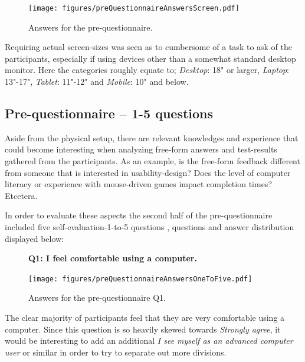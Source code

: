 \documentclass[nofilelist,dvipsnames]{cslthse-msc}
\begin{document}
{				\begin{figure}[h!]
					\centering
					\texttt{[image: figures/preQuestionnaireAnswersScreen.pdf]}
					\caption{Answers for the pre-questionnaire.}
				\end{figure}

        Requiring actual screen-sizes was seen as to cumbersome of a task to
        ask of the participants, especially if using devices other than a
        somewhat standard desktop monitor. Here the categories roughly equate
        to; \textit{Desktop}: 18" or larger, \textit{Laptop}: 13"-17", \textit{Tablet}:
        11"-12" and \textit{Mobile}: 10" and below.

			\subsection{Pre-questionnaire -- 1-5 questions}

        Aside from the physical setup, there are relevant knowledges and
        experience that could become interesting when analyzing free-form
        answers and test-results gathered from the participants. As an example,
        is the free-form feedback different from someone that is interested in
        usability-design? Does the level of computer literacy or experience
        with mouse-driven games impact completion times? Etcetera.

        In order to evaluate these aspects the second half of the
        pre-questionnaire included five self-evaluation-1-to-5 questions
        , questions and answer distribution
        displayed below:

				\begin{figure}[h!]
          \textbf{Q1: I feel comfortable using a computer.}
          \begin{center}
            \texttt{[image: figures/preQuestionnaireAnswersOneToFive.pdf]}
            \vspace{-1cm}
            \caption{Answers for the pre-questionnaire Q1.}
          \end{center}
				\end{figure}

        The clear majority of participants feel that they are very comfortable
        using a computer. Since this question is so heavily skewed towards
        \textit{Strongly agree}, it would be interesting to add an additional
        \textit{I see myself as an advanced computer user} or similar in order
        to try to separate out more divisions.

}
\end{document}

